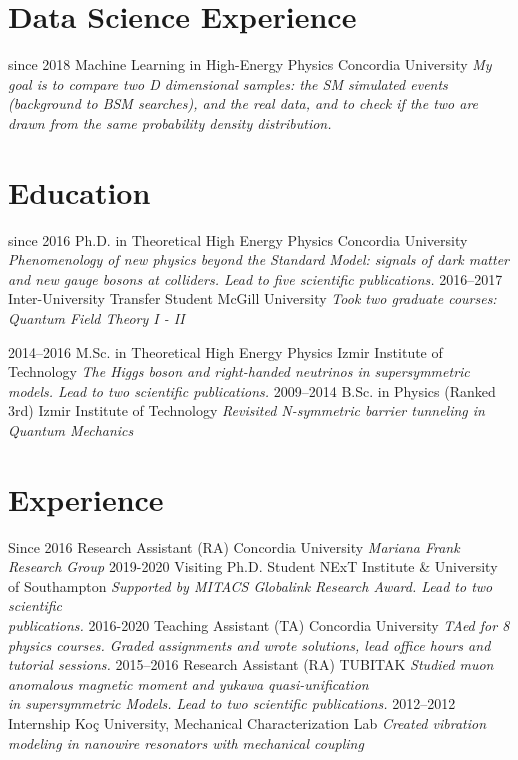 \documentclass[]{friggeri-cv}
\begin{document}
\section{Data Science Experience}

\begin{entrylist}
	\entry
	{since 2018}
	{Machine Learning in High-Energy Physics}
	{Concordia University}
   {\emph{My goal is to compare two D dimensional samples: the SM simulated events (background to BSM searches), and the real data, and to check if the two are drawn from the same probability density distribution.}}

\end{entrylist}

\section{Education}
\begin{entrylist}
  \entry
    {since 2016}
    {Ph.D. in Theoretical High Energy Physics}
    {Concordia University}
    {\emph{Phenomenology of new physics beyond the Standard Model: signals of dark matter and new gauge bosons at colliders. Lead to five scientific publications.}}
   \entry
   {2016--2017}
   {Inter-University Transfer Student}
   {McGill University}
   {\emph{Took two graduate courses: Quantum Field Theory I -  II}}
   
  \entry
    {2014–2016}
    {M.Sc. in Theoretical High Energy Physics}
    {Izmir Institute of Technology}
    {\emph{The Higgs boson and right-handed neutrinos in supersymmetric models. Lead to two scientific publications.}}
  \entry
    {2009–2014}
    {B.Sc. in Physics (Ranked 3rd)}
    {Izmir Institute of Technology}
    {\emph{Revisited N-symmetric barrier tunneling in Quantum Mechanics}}
    

\end{entrylist}

\section{Experience}

\begin{entrylist}
    \entry
	{Since 2016}
	{Research Assistant (RA)}
	{Concordia University}
	{\emph{Mariana Frank Research Group}}	
	 \entry
    {2019-2020}
    {Visiting Ph.D. Student}
    {NExT Institute \& University of Southampton}
    {\emph {Supported by MITACS Globalink Research Award. Lead to two scientific \\ publications.}}
    \entry
    {2016-2020}
    {Teaching Assistant (TA)}
    {Concordia University}
    {\emph{
    		TAed for 8 physics courses. Graded assignments and wrote solutions, lead office hours and tutorial sessions.
	}}
    \entry
    {2015--2016}
    {Research Assistant (RA)}
    {TUBITAK}
    {\emph{Studied muon anomalous magnetic moment and yukawa quasi-unification \\ in supersymmetric Models. Lead to two scientific publications.}}  
    \entry
  	{2012--2012}
  	{Internship}
  	{Koç University, Mechanical Characterization Lab}
  	{\emph{Created vibration modeling in nanowire resonators with mechanical coupling}}  
\end{entrylist}
\end{document}
